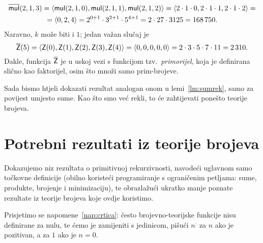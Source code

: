 \begin{primjer}\label{pr:primorijel}
\begin{multline}
    \overline{\mathsf{mul}}(2,1,3)=\langle\mathsf{mul}(2,1,0),\mathsf{mul}(2,1,1),\mathsf{mul}(2,1,2)\rangle=\langle2\cdot1\cdot0,2\cdot1\cdot1,2\cdot1\cdot2\rangle=\\
    =\langle0,2,4\rangle=2^{0+1}\cdot3^{2+1}\cdot5^{4+1}=2\cdot27\cdot3125=168\,750.
\end{multline}
Naravno, $k$ može biti i $1$; jedan važan slučaj je
\begin{equation}
    \overline{\mathsf Z}(5)=\langle\mathsf Z(0),\mathsf Z(1),\mathsf Z(2),\mathsf Z(3),\mathsf Z(4)\rangle=\langle0,0,0,0,0\rangle=2\cdot3\cdot5\cdot7\cdot11=2\,310.
\end{equation}
Dakle, funkcija $\overline{\mathsf Z}$ je u uskoj vezi s funkcijom tzv.\ \emph{primorijel}, koja je definirana slično kao faktorijel, osim što množi samo prim-brojeve. 
\end{primjer}

Sada bismo htjeli dokazati rezultat analogan onom u lemi~\ref{lm:sumrek}, samo za povijest umjesto sume. Kao što smo već rekli, to će zahtijevati ponešto teorije brojeva.

\section{Potrebni rezultati iz teorije brojeva}\label{sec:teobroj}

Dokazujemo niz rezultata o primitivnoj rekurzivnosti, navodeći uglavnom samo toč\-kov\-ne definicije (obilno koristeći programiranje s ograničenim petljama: sume, produkte, brojenje i minimizaciju), te obrazlažući ukratko manje poznate rezultate iz teorije brojeva koje ovdje koristimo.

Prisjetimo se napomene~\ref{nap:crtica}: često brojevno-teorijske funkcije nisu definirane za nulu, te ćemo je zamijeniti s jedinicom, pišući $n^\cdot$ za $n$ ako je pozitivan, a za $1$ ako je $n=0$.

